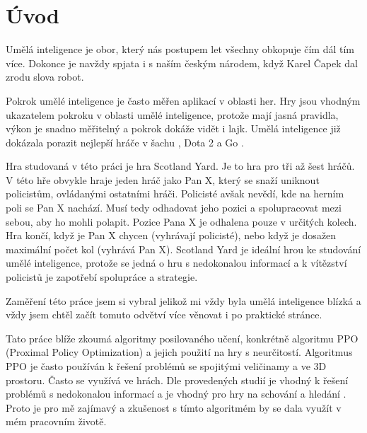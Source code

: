 
%

\newtheorem{definition}{\textbf{Definice}}

\chapter{Úvod}
\label{uvod}

Umělá inteligence je obor, který nás postupem let všechny obkopuje čím dál tím více.
Dokonce je navždy spjata i s naším českým národem, když Karel Čapek dal zrodu slova robot.

Pokrok umělé inteligence je často měřen aplikací v oblasti her.
Hry jsou vhodným ukazatelem pokroku v oblasti umělé inteligence, protože mají jasná pravidla, výkon je snadno měřitelný a pokrok dokáže vidět i lajk.
Umělá inteligence již dokázala porazit nejlepší hráče v šachu \cite{DeepBlue}, Dota 2 \cite{Dota2} a Go \cite{AlphaGo}.

Hra studovaná v této práci je hra Scotland Yard.
Je to hra pro tři až šest hráčů.
V této hře obvykle hraje jeden hráč jako Pan X, který se snaží uniknout policistům, ovládanými ostatními hráči.
Policisté avšak nevědí, kde na herním poli se Pan X nachází.
Musí tedy odhadovat jeho pozici a spolupracovat mezi sebou, aby ho mohli polapit.
Pozice Pana X je odhalena pouze v určitých kolech.
Hra končí, když je Pan X chycen (vyhrávají policisté), nebo když je dosažen maximální počet kol (vyhrává Pan X).
Scotland Yard je ideální hrou ke studování umělé inteligence, protože se jedná o hru s nedokonalou informací a k vítězství policistů je zapotřebí spolupráce a strategie.

Zaměření této práce jsem si vybral jelikož mi vždy byla umělá inteligence blízká a vždy jsem chtěl začít tomuto odvětví více věnovat i po praktické stránce.

Tato práce blíže zkoumá algoritmy posilovaného učení, konkrétně algoritmu PPO (Proximal Policy Optimization) a jejich použití na hry s neurčitostí.
Algoritmus PPO je často používán k řešení problémů se spojitými veličinamy a ve 3D prostoru.
Často se využívá ve hrách.
Dle provedených studií je vhodný k řešení problémů s nedokonalou informací \cite{Manille} a je vhodný pro hry na schování a hledání \cite{PPO_Hide_Seek}.
Proto je pro mě zajímavý a zkušenost s tímto algoritmém by se dala využít v mém pracovním životě.

